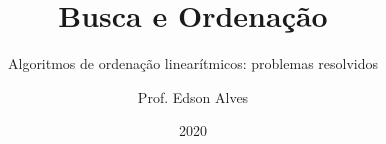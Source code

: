 \title{Busca e Ordenação}
\subtitle{Algoritmos de ordenação linearítmicos: problemas resolvidos}
\date{2020}
\author{Prof. Edson Alves}
